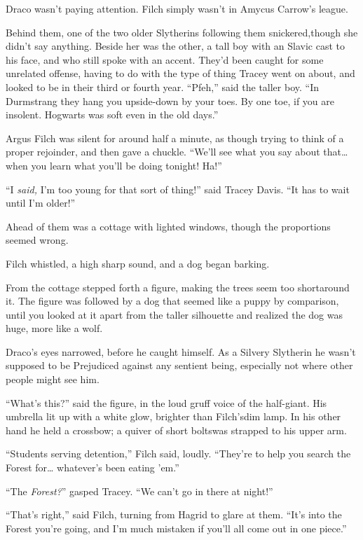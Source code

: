 Draco wasn't paying attention. Filch simply wasn't in Amycus Carrow's league.

Behind them, one of the two older Slytherins following them snickered,though she didn't say anything. Beside her was the other, a tall boy with an Slavic cast to his face, and who still spoke with an accent. They'd been caught for some unrelated offense, having to do with the type of thing Tracey went on about, and looked to be in their third or fourth year. ``Pfeh,'' said the taller boy. ``In Durmstrang they hang you upside-down by your toes. By one toe, if you are insolent. Hogwarts was soft even in the old days.''

Argus Filch was silent for around half a minute, as though trying to think of a proper rejoinder, and then gave a chuckle. ``We'll see what you say about that\ldots{} when you learn what you'll be doing tonight! Ha!''

``I \emph{said,} I'm too young for that sort of thing!'' said Tracey Davis. ``It has to wait until I'm older!''

Ahead of them was a cottage with lighted windows, though the proportions seemed wrong.

Filch whistled, a high sharp sound, and a dog began barking.

From the cottage stepped forth a figure, making the trees seem too shortaround it. The figure was followed by a dog that seemed like a puppy by comparison, until you looked at it apart from the taller silhouette and realized the dog was huge, more like a wolf.

Draco's eyes narrowed, before he caught himself. As a Silvery Slytherin he wasn't supposed to be Prejudiced against any sentient being, especially not where other people might see him.

``What's this?'' said the figure, in the loud gruff voice of the half-giant. His umbrella lit up with a white glow, brighter than Filch'sdim lamp. In his other hand he held a crossbow; a quiver of short boltswas strapped to his upper arm.

``Students serving detention,'' Filch said, loudly. ``They're to help you search the Forest for\ldots{} whatever's been eating 'em.''

``The \emph{Forest?}'' gasped Tracey. ``We can't go in there at night!''

``That's right,'' said Filch, turning from Hagrid to glare at them. ``It's into the Forest you're going, and I'm much mistaken if you'll all come out in one piece.''

